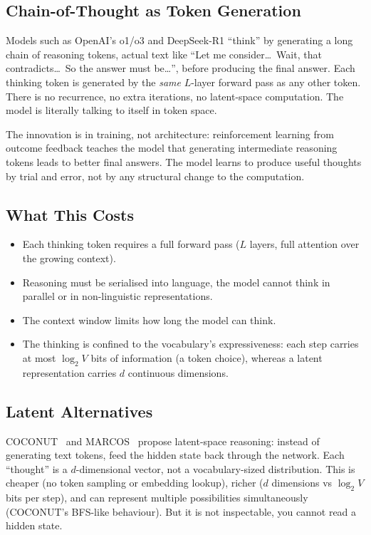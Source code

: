 \documentclass[11pt, a4paper]{article}
\theoremstyle{plain}
\theoremstyle{definition}
\theoremstyle{remark}
\begin{document}
\subsection{Chain-of-Thought as Token Generation}

Models such as OpenAI's o1/o3 and DeepSeek-R1 ``think'' by generating a long chain of reasoning tokens, actual text like ``Let me consider\ldots\ Wait, that contradicts\ldots\ So the answer must be\ldots'', before producing the final answer.
Each thinking token is generated by the \emph{same} $L$-layer forward pass as any other token.
There is no recurrence, no extra iterations, no latent-space computation.
The model is literally talking to itself in token space.

The innovation is in training, not architecture: reinforcement learning from outcome feedback teaches the model that generating intermediate reasoning tokens leads to better final answers.
The model learns to produce useful thoughts by trial and error, not by any structural change to the computation.

\subsection{What This Costs}

\begin{itemize}[nosep]
    \item Each thinking token requires a full forward pass ($L$ layers, full attention over the growing context).
    \item Reasoning must be serialised into language, the model cannot think in parallel or in non-linguistic representations.
    \item The context window limits how long the model can think.
    \item The thinking is confined to the vocabulary's expressiveness: each step carries at most $\log_2 V$ bits of information (a token choice), whereas a latent representation carries $d$ continuous dimensions.
\end{itemize}

\subsection{Latent Alternatives}

COCONUT~\cite{coconut2024} and MARCOS~\cite{marcos2025} propose latent-space reasoning: instead of generating text tokens, feed the hidden state back through the network.
Each ``thought'' is a $d$-dimensional vector, not a vocabulary-sized distribution.
This is cheaper (no token sampling or embedding lookup), richer ($d$ dimensions vs $\log_2 V$ bits per step), and can represent multiple possibilities simultaneously (COCONUT's BFS-like behaviour).
But it is not inspectable, you cannot read a hidden state.
\end{document}
